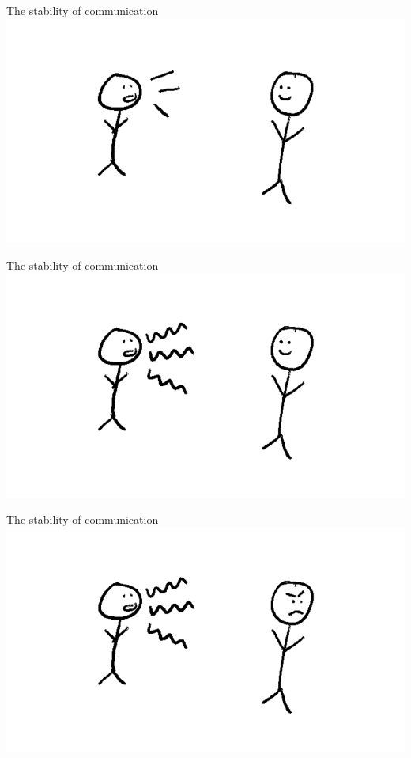 \documentclass[xcolor=table]{beamer}       %
\begin{document}
\begin{frame}{The stability of communication}
    \includegraphics[width=\textwidth]{img/stability-communication-1.png}
\end{frame}
\begin{frame}{The stability of communication}
    \includegraphics[width=\textwidth]{img/stability-communication-2.png}
\end{frame}
\begin{frame}{The stability of communication}
    \includegraphics[width=\textwidth]{img/stability-communication-3.png}
\end{frame}
\end{document}
